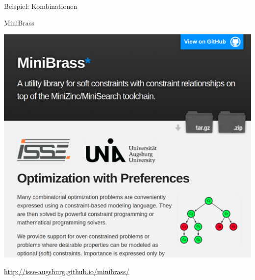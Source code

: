 \begin{frame}{Beispiel: Kombinationen~\cite{SchiendorferPvs2015}}

\end{frame}


\begin{frame}[fragile]{MiniBrass}

\begin{center}

\includegraphics[width=.5\textwidth]{img/minibrass.png}

\vspace*{2ex}

\url{http://isse-augsburg.github.io/minibrass/}

\end{center}

\end{frame}

